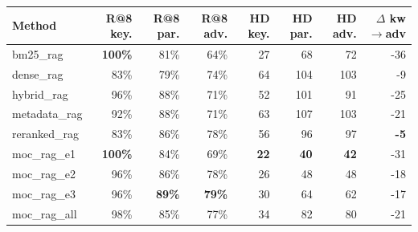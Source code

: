 \begin{tabular}{l rrr rrr r}
\toprule
Method & R@8 key. & R@8 par. & R@8 adv. & HD key. & HD par. & HD adv. & $\Delta$ kw$\to$adv \\
\midrule
bm25\_rag & \textbf{100\%} & 81\% & 64\% & 27 & 68 & 72 & -36 \\
dense\_rag & 83\% & 79\% & 74\% & 64 & 104 & 103 & -9 \\
hybrid\_rag & 96\% & 88\% & 71\% & 52 & 101 & 91 & -25 \\
metadata\_rag & 92\% & 88\% & 71\% & 63 & 107 & 103 & -21 \\
reranked\_rag & 83\% & 86\% & 78\% & 56 & 96 & 97 & \textbf{-5} \\
\rowcolor{mocblue!8} moc\_rag\_e1 & \textbf{100\%} & 84\% & 69\% & \textbf{22} & \textbf{40} & \textbf{42} & -31 \\
\rowcolor{mocblue!8} moc\_rag\_e2 & 96\% & 86\% & 78\% & 26 & 48 & 48 & -18 \\
\rowcolor{mocblue!8} moc\_rag\_e3 & 96\% & \textbf{89\%} & \textbf{79\%} & 30 & 64 & 62 & -17 \\
\rowcolor{mocblue!8} moc\_rag\_all & 98\% & 85\% & 77\% & 34 & 82 & 80 & -21 \\
\bottomrule
\end{tabular}
